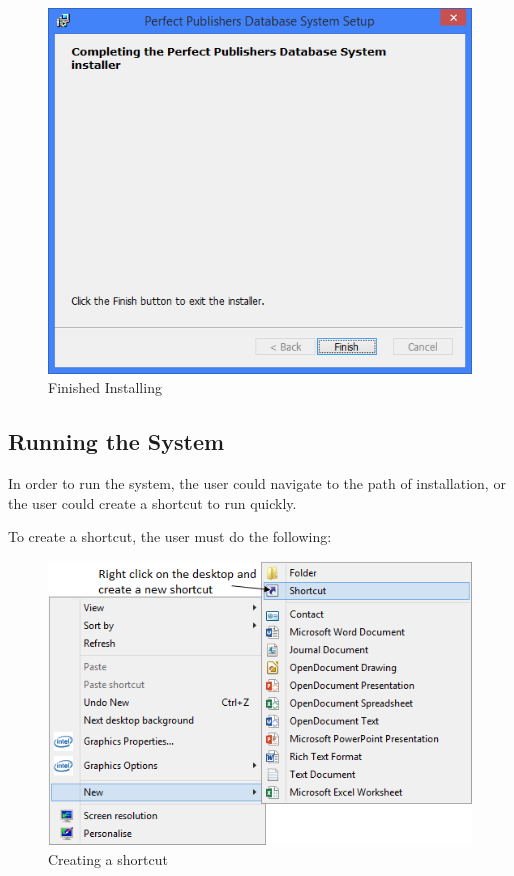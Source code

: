 \begin{figure}[H]
    \includegraphics[width=\textwidth]{./Manual/Installation/Installed.png}
    \caption{Finished Installing}
\end{figure}


\subsection{Running the System}

In order to run the system, the user could navigate to the path of installation, or the user could create a shortcut to run quickly.

To create a shortcut, the user must do the following:

\begin{figure}[H]
    \includegraphics[width=\textwidth]{./Manual/Installation/Shortcut.png}
    \caption{Creating a shortcut}
\end{figure}

